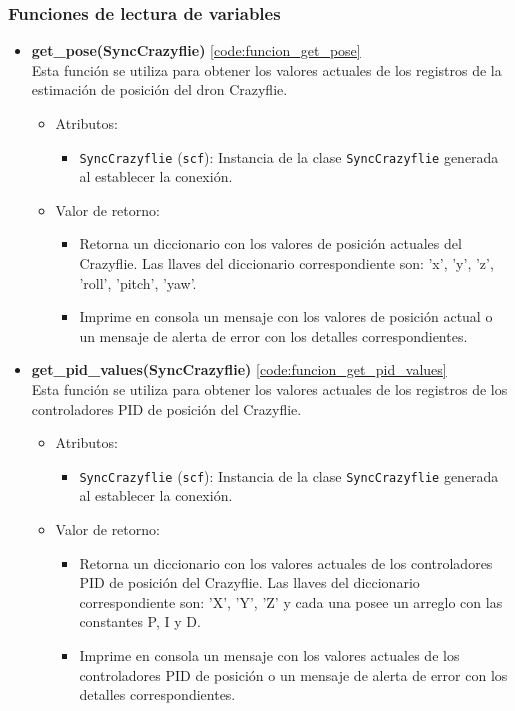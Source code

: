 \subsubsection{Funciones de lectura de variables}
\begin{itemize}
	\item \textbf{get\_pose(SyncCrazyflie)} \ref{code:funcion_get_pose}\\ 
	Esta función se utiliza para obtener los valores actuales de los registros de la estimación de posición del dron Crazyflie.
	\begin{itemize}
		\item Atributos:
		\begin{itemize}
			\item \texttt{SyncCrazyflie} (\texttt{scf}): Instancia de la clase \texttt{SyncCrazyflie} generada al establecer la conexión.
		\end{itemize}
		\item Valor de retorno:
		\begin{itemize}
			\item Retorna un diccionario con los valores de posición actuales del Crazyflie. Las llaves del diccionario correspondiente son: 'x', 'y', 'z', 'roll', 'pitch', 'yaw'.
			\item Imprime en consola un mensaje con los valores de posición actual o un mensaje de alerta de error con los detalles correspondientes.
		\end{itemize}
	\end{itemize} 
	\vspace{1mm} %
	\item \textbf{get\_pid\_values(SyncCrazyflie)} \ref{code:funcion_get_pid_values}\\ 
	Esta función se utiliza para obtener los valores actuales de los registros de los controladores PID de posición del Crazyflie.
	\begin{itemize}
		\item Atributos:
		\begin{itemize}
			\item \texttt{SyncCrazyflie} (\texttt{scf}): Instancia de la clase \texttt{SyncCrazyflie} generada al establecer la conexión.
		\end{itemize}
		\item Valor de retorno:
		\begin{itemize}
			\item Retorna un diccionario con los valores actuales de los controladores PID de posición  del Crazyflie. Las llaves del diccionario correspondiente son: 'X', 'Y', 'Z' y cada una posee un arreglo con las constantes P, I y D.
			\item Imprime en consola un mensaje con los valores actuales de los controladores PID de posición o un mensaje de alerta de error con los detalles correspondientes.
		\end{itemize}
	\end{itemize} 
	\vspace{1mm} %
	

\end{itemize}
